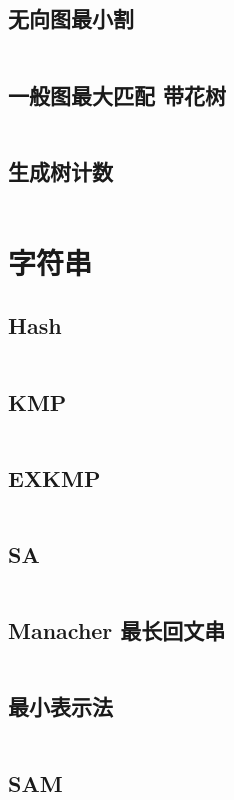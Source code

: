 \documentclass[titlepage,landscape,a4paper,10pt]{article}
\begin{document}
\begin{multicols}{2}
\begin{spacing}{0.8}
\subsection{无向图最小割}
\inputminted{cpp}{Graph/无向图最小割.cpp}

\subsection{一般图最大匹配 带花树}
\inputminted{cpp}{Graph/带花树.cpp}

\subsection{生成树计数}
\inputminted{cpp}{Graph/生成树计数.cpp}

\section{字符串}

\subsection{Hash}
\inputminted{cpp}{Strings/BKDRHash.cpp}

\subsection{KMP}
\inputminted{cpp}{Strings/KMP.cpp}

\subsection{EXKMP}
\inputminted{cpp}{Strings/EXKMP.cpp}

\subsection{SA}
\inputminted{cpp}{Strings/SA.cpp}

\subsection{Manacher 最长回文串}
\inputminted{cpp}{Strings/Manacher.cpp}

\subsection{最小表示法}
\inputminted{cpp}{Strings/最小表示法.cpp}

\subsection{SAM}
\inputminted{cpp}{Strings/SAM.cpp}


\end{spacing}
\end{multicols}
\end{document}
